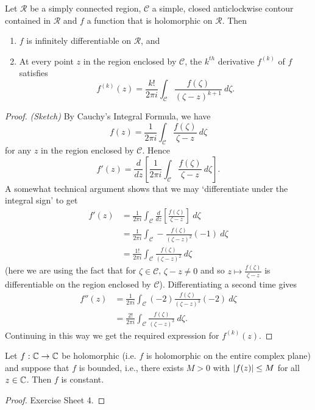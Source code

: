 \begin{theorem}
\label{t:cauchyd}
Let $\mathcal{R}$ be a simply connected region, $\mathcal{C}$ a simple, closed anticlockwise contour contained in $\mathcal{R}$ and $f$ a function that is holomorphic on $\mathcal{R}$. Then
\begin{enumerate}
\item $f$ is infinitely differentiable on $\mathcal{R}$, and
\item At every point $z$ in the region enclosed by $\mathcal{C}$, the $k^{th}$ derivative $f^{(k)}$ of $f$ satisfies
\[
f^{(k)}(z) = \frac{k!}{2\pi i} \int_{\mathcal{C}} \frac{f(\zeta)}{(\zeta-z)^{k+1}}\ d \zeta.
\]
\end{enumerate}
\end{theorem}
\begin{proof} \emph{(Sketch)}
By Cauchy's Integral Formula, we have
\[
f(z) = \frac{1}{2\pi i} \int_{\mathcal{C}} \frac{f(\zeta)}{\zeta-z}\ d\zeta
\]
for any $z$ in the region enclosed by $\mathcal{C}$.  Hence
\[
f'(z) = \frac{d}{dz} \left[ \frac{1}{2\pi i} \int_{\mathcal{C}} \frac{f(\zeta)}{\zeta-z}\ d\zeta \right].
\] 
A somewhat technical argument shows that we may `differentiate under the integral sign' to get
\begin{align*}
f'(z) &= \frac{1}{2\pi i}\int_{\mathcal{C}} \frac{d}{dz} \left[ \frac{f(\zeta)}{\zeta-z} \right]\ d\zeta \\
& = \frac{1}{2\pi i} \int_{\mathcal{C}} -  \frac{f(\zeta)}{(\zeta-z)^2} (-1)\ d \zeta \\
& = \frac{1!}{2\pi i} \int_{\mathcal{C}}   \frac{f(\zeta)}{(\zeta-z)^2} \ d \zeta 
\end{align*}
(here we are using the fact that for $\zeta \in \mathcal{C}$, $\zeta-z \neq 0$ and so $z \mapsto \frac{f(\zeta)}{\zeta-z}$ is differentiable on the region enclosed by $\mathcal{C}$). Differentiating a second time gives
\begin{align*}
f''(z) &= \frac{1}{2\pi i} \int_{\mathcal{C}} (-2) \frac{f(\zeta )}{(\zeta-z)^3} (-2)\ d\zeta \\
& = \frac{2!}{2\pi i} \int_{\mathcal{C}} \frac{f( \zeta)}{(\zeta-z)^3}\ d\zeta.
\end{align*}
Continuing in this way we get the required expression for $f^{(k)}(z)$.
\end{proof}
\begin{theorem}
Let $f:\mathbb{C} \to \mathbb{C}$ be holomorphic (i.e. $f$ is holomorphic on the entire complex plane) and suppose that $f$ is bounded, i.e., there exists $M>0$ with $\left| f(z) \right|\leq M$ for all $z \in \mathbb{C}$.  Then $f$ is constant.
\end{theorem}
\begin{proof}
Exercise Sheet 4.
\end{proof}
